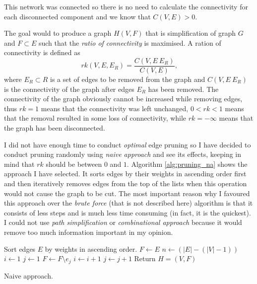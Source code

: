     This network was connected so there is no need to calculate the connectivity for each disconnected component and we know that $C(V, E) > 0$.
    
    The goal would to produce a graph $H(V, F)$ that is simplification of graph $G$ and $F \subset E$ such that the \emph{ratio of connectivity} is maximised. A ration of connectivity is defined as
    \begin{equation}
     rk (V, E, E_R) = \frac{C(V, E \ E_R)}{C(V, E)} \mbox{,}
    \end{equation}
    where $E_R \subset R$ is a set of edges to be removed from the graph and $C(V, E \ E_R)$ is the connectivity of the graph after edges $E_R$ has been removed. The connectivity of the graph obviously cannot be increased while removing edges, thus $rk = 1$ means that the connectivity was left unchanged, $0 < rk < 1$ means that the removal resulted in some loss of connectivity, while $rk = -\infty$ means that the graph has been disconnected.
    
    I did not have enough time to conduct \emph{optimal} edge pruning so I have decided to conduct pruning randomly using \emph{naive approach} and see its effects, keeping in mind that $rk$ should be between $0$ and $1$. Algorithm \ref{alg:pruning_na} shows the approach I have selected. It sorts edges by their weights in ascending order first and then iteratively removes edges from the top of the lists when this operation would not cause the graph to be cut. The most important reason why I favoured this approach over the \emph{brute force} (that is not described here) algorithm is that it consists of less steps and is much less time consuming (in fact, it is the quickest)\cite{ZhouMahlerToivonen2012}. I could not use \emph{path simplification} or \emph{combinational approach} because it would remove too much information important in my opinion.
    \begin{algorithm}[H]
      \begin{algorithmic}[1]
          \State Sort edges $E$ by weights in ascending order.
          \State $F \gets E$
          \State $n \gets (|E| - (|V| - 1))$
          \State $i \gets 1$
          \State $j \gets 1$
              \State $F \gets F \setminus {e_j}$
              \State $i \gets i + 1$
            \EndIf
            \State $j \gets j + 1$
          \EndWhile
          \State Return $H = (V, F)$
        \EndProcedure
      \end{algorithmic}
      \caption{Naive approach.}
      \label{alg:pruning_na}
    \end{algorithm}
    
